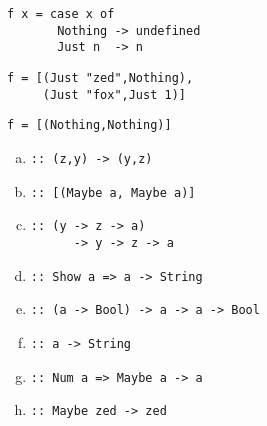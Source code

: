 \documentclass[12pt]{article}
\begin{document}
\begin{enumerate}
\begin{minipage}{2.5in}
\item \begin{verbatim}
f x = case x of
       Nothing -> undefined
       Just n  -> n 
\end{verbatim}

\item \begin{verbatim}
f = [(Just "zed",Nothing),
     (Just "fox",Just 1)]
\end{verbatim}

\item \begin{verbatim}
f = [(Nothing,Nothing)]
\end{verbatim}
\end{minipage}
\hspace{1.2in}
\begin{minipage}{2in}
\begin{enumerate}[(a)]
\item \begin{verbatim}
:: (z,y) -> (y,z)
\end{verbatim}

\item \begin{verbatim}
:: [(Maybe a, Maybe a)]
\end{verbatim}

\item \begin{verbatim}
:: (y -> z -> a) 
      -> y -> z -> a
\end{verbatim}


\item \begin{verbatim}
:: Show a => a -> String
\end{verbatim}

\item \begin{verbatim}
:: (a -> Bool) -> a -> a -> Bool
\end{verbatim}

\item \begin{verbatim}
:: a -> String
\end{verbatim}
\item \begin{verbatim}
:: Num a => Maybe a -> a
\end{verbatim}

\item \begin{verbatim}
:: Maybe zed -> zed
\end{verbatim}


\end{enumerate}
\end{minipage}
\end{enumerate}
\end{document}
